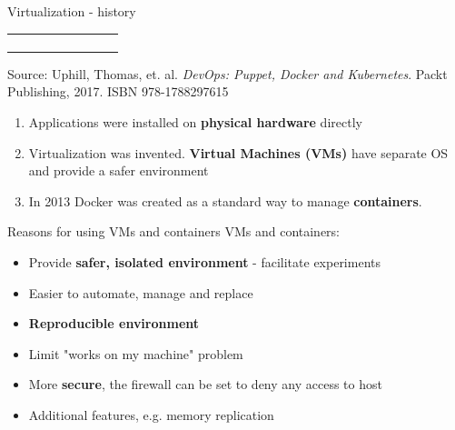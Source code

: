 \documentclass{beamer}
\begin{document}
\begin{frame}{Virtualization - history}
\begin{center}
\begin{tabular}{@{}  l  l l }
\begin{figure}
		\label{fig:virtualization-c}
	\end{figure} \\
	\end{tabular}
\end{center}
\tiny{Source: Uphill, Thomas, et. al. \textit{DevOps: Puppet, Docker and Kubernetes}. Packt Publishing, 2017. ISBN 978-1788297615}
\\
\footnotesize{
\begin{enumerate}
	\item Applications were installed on \textbf{physical hardware} directly
	\item Virtualization was invented. \textbf{Virtual Machines (VMs)} have separate OS and provide a safer environment
	\item In 2013 Docker was created as a standard way to manage \textbf{containers}.
\end{enumerate}
}
\end{frame}






\begin{frame}{Reasons for using VMs and containers}%
VMs and containers:
\begin{itemize}
\item Provide \textbf{safer, isolated environment} - facilitate experiments
\item Easier to automate, manage and replace
\item \textbf{Reproducible environment}
\item Limit "works on my machine" problem
\item More \textbf{secure}, the firewall can be set to deny any access to host
\item Additional features, e.g. memory replication
\end{itemize}
\end{frame}
\end{document}
